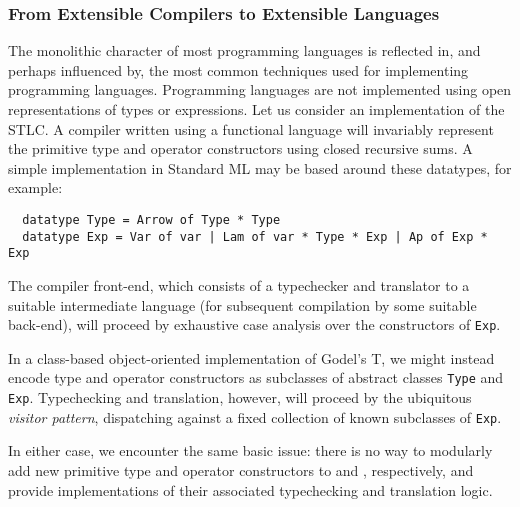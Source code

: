 
\subsubsection{From Extensible Compilers to Extensible Languages}\label{evolution}
The monolithic character of most programming languages is reflected in, and perhaps influenced by, the most common techniques used for implementing programming languages. Programming languages are not implemented using open representations of types or expressions. 
Let us consider an implementation of the STLC. 
A compiler written using a functional language will invariably represent the primitive type  and operator constructors using {closed} recursive sums. 
A simple implementation in Standard ML may be based around these datatypes, for example:
\begin{lstlisting}
  datatype Type = Arrow of Type * Type
  datatype Exp = Var of var | Lam of var * Type * Exp | Ap of Exp * Exp 
\end{lstlisting}

The compiler front-end, which consists of a typechecker and translator to a suitable intermediate language (for subsequent compilation by some suitable back-end), will proceed by exhaustive case analysis over the constructors of \lstinline{Exp}.

In a class-based object-oriented implementation of Godel's T, we might instead encode type and operator constructors as subclasses of abstract classes \lstinline{Type} and \lstinline{Exp}. Typechecking and translation, however, will proceed by the ubiquitous \emph{visitor pattern}, dispatching against a fixed collection of {known} subclasses of \lstinline{Exp}.

In either case, we encounter the same basic issue: there is no way to modularly add new primitive type and operator constructors to  and , respectively, and provide implementations of their associated typechecking and translation logic. 

